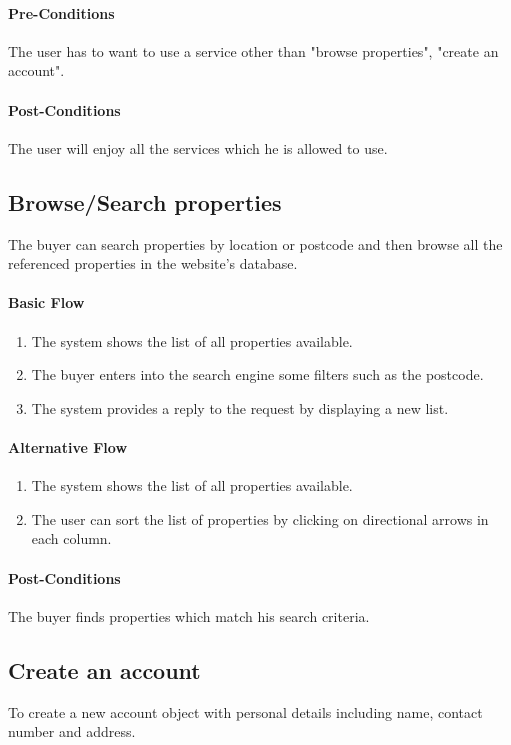 \documentclass[a4paper,12pt]{article}
\begin{document}
\paragraph{Pre-Conditions}
The user has to want to use a service other than "browse properties", "create an account".
\paragraph{Post-Conditions}
The user will enjoy all the services which he is allowed to use.

\subsection{Browse/Search properties}
The buyer can search properties by location or postcode and then browse all the referenced properties in the website's database.
\paragraph{Basic Flow}
\begin{enumerate}
\item The system shows the list of all properties available.
\item The buyer enters into the search engine some filters such as the postcode.
\item The system provides a reply to the request by displaying a new list.
\end{enumerate}
\paragraph{Alternative Flow}
\begin{enumerate}
\item The system shows the list of all properties available.
\item The user can sort the list of properties by clicking on directional arrows in each column.
\end{enumerate}
\paragraph{Post-Conditions}
The buyer finds properties which match his search criteria.

\subsection{Create an account}
To create a new account object with personal details including name, contact number and address.
\end{document}
